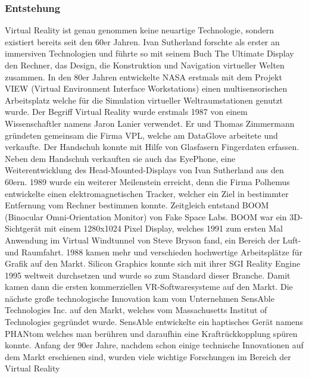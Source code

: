 \documentclass[a4paper,12pt,oneside]{article}
\begin{document}
      \subsubsection{Entstehung}
        Virtual Reality ist genau genommen keine neuartige Technologie, sondern existiert
        bereits seit den 60er Jahren. Ivan Sutherland forschte als erster an immersiven 
        Technologien und führte so mit seinem Buch \glqq The Ultimate Display\grqq{} 
        den Rechner, das Design, die Konstruktion und Navigation virtueller Welten zusammen.
        In den 80er Jahren entwickelte NASA erstmals mit dem Projekt VIEW (Virtual 
        Environment Interface Workstations) einen multisensorischen Arbeitsplatz welche für 
        die Simulation virtueller Weltraumstationen genutzt wurde.
        Der Begriff Virtual Reality wurde erstmals 1987 von einem Wissenschaftler namens Jaron
        Lanier verwendet. Er und Thomas Zimmermann gründeten gemeinsam die Firma VPL, welche
        am \glqq DataGlove\grqq{} arbeitete und verkaufte. Der Handschuh konnte mit Hilfe
        von Glasfasern Fingerdaten erfassen. Neben dem Handschuh verkauften sie auch das 
        \glqq EyePhone\grqq{}, eine Weiterentwicklung des Head-Mounted-Displays von Ivan
        Sutherland aus den 60ern.
        1989 wurde ein weiterer Meilenstein erreicht, denn die Firma Polhemus entwickelte 
        einen elektromagnetischen Tracker, welcher ein Ziel in bestimmter Entfernung vom 
        Rechner bestimmen konnte. 
        Zeitgleich entstand BOOM (Binocular Omni-Orientation Monitor) von Fake Space Labs.
        BOOM war ein 3D-Sichtgerät mit einem 1280x1024 Pixel Display, welches 1991 zum 
        ersten Mal Anwendung im \glqq Virtual Windtunnel\grqq{} von Steve Bryson fand, 
        ein Bereich der Luft- und Raumfahrt.
        1988 kamen mehr und verschieden hochwertige Arbeitsplätze für Grafik auf den Markt.
        Silicon Graphics konnte sich mit ihrer SGI Reality Engine 1995 weltweit durchsetzen
        und wurde so zum Standard dieser Branche. Damit kamen dann die ersten kommerziellen
        VR-Softwaresysteme auf den Markt.
        Die nächste große technologische Innovation kam vom Unternehmen SensAble
        Technologies Inc. auf den Markt, welches vom Massachusetts Institut of Technologies
        gegründet wurde. SensAble entwickelte ein haptisches Gerät namens 
        \glqq PHANtom\grqq{} welches man berühren und daraufhin eine
        Kraftrückkopplung spüren konnte.
        Anfang der 90er Jahre, nachdem schon einige technische Innovationen auf dem Markt
        erschienen sind, wurden viele wichtige Forschungen im Bereich der Virtual Reality
\end{document}
